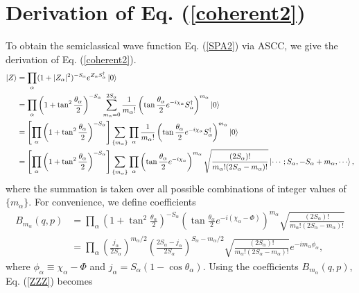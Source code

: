 \documentclass[11pt]{book} %
\begin{document}
\section{Derivation of Eq. (\ref{coherent2})}
\label{wave_func2}

To obtain the semiclassical wave function Eq. (\ref{SPA2}) via ASCC, we give the derivation of Eq. (\ref{coherent2}).
\begin{align}
\ket{Z} &= \prod_{\alpha} (1+|Z_{\alpha}|^2)^{-S_{\alpha}}e^{Z_{\alpha}S_{\alpha}^{\dag}}\ket{0} \nonumber \\
&= \prod_{\alpha} \left(1+\tan^2{\frac{\theta_{\alpha}}{2}}\right)^{-S_{\alpha}} \sum_{m_{\alpha}=0}^{2S_{\alpha}} \frac{1}{m_{\alpha}!}
  \left(
  \tan{\frac{\theta_{\alpha}}{2}}e^{-i\chi_{\alpha}}S_{\alpha}^{\dag} \right)^{m_{\alpha}} \ket{0} \nonumber \\
&= \left[ \prod_{\alpha} \left(1+\tan^2{\frac{\theta_{\alpha}}{2}}\right)^{-S_{\alpha}} \right] 
\sum_{\{m_{\alpha}\}} \prod_{\alpha} \frac{1}{m_{\alpha}!} 
  \left(
  \tan{\frac{\theta_{\alpha}}{2}}e^{-i\chi_{\alpha}}S_{\alpha}^{\dag} \right)^{m_{\alpha}} \ket{0} \nonumber \\
&= \left[ \prod_{\alpha} \left(1+\tan^2{\frac{\theta_{\alpha}}{2}}\right)^{-S_{\alpha}} \right] 
\sum_{\{m_{\alpha}\}} \prod_{\alpha} \left(
  \tan{\frac{\theta_{\alpha}}{2}}e^{-i\chi_{\alpha}} \right)^{m_{\alpha}} \sqrt{\frac{(2S_{\alpha})!}{m_{\alpha}!(2S_{\alpha}-m_{\alpha})!}}
  \ket{\cdots;S_{\alpha},-S_{\alpha}+m_{\alpha},\cdots}, 
\label{ZZZ}
\end{align}
where the summation is taken over all possible combinations
of integer values of $\{ m_\alpha\}$. For convenience, we define coefficients
\begin{align}
B_{m_{\alpha}}(q,p) &= \prod_{\alpha} \left(1+\tan^2{\frac{\theta_{\alpha}}{2}}\right)^{-S_{\alpha}} \left(
  \tan{\frac{\theta_{\alpha}}{2}}e^{-i(\chi_{\alpha}-\Phi)} \right)^{m_{\alpha}} \sqrt{\frac{(2S_{\alpha})!}{m_{\alpha}!(2S_{\alpha}-m_{\alpha})!}} \nonumber \\
 &=\prod_\alpha \left(\frac{j_\alpha}{2S_\alpha}\right)^{m_\alpha/2}\left(\frac{2S_\alpha-j_\alpha}{2S_\alpha}\right)^{S_\alpha-m_\alpha/2}
 \sqrt{\frac{(2S_\alpha)!}{m_\alpha!(2S_\alpha-m_\alpha)!}}
e^{-i m_\alpha\phi_\alpha} ,
\end{align}
where $\phi_\alpha \equiv\chi_{\alpha}-\Phi$ and $j_\alpha=S_\alpha(1-\cos{\theta_\alpha})$. Using the coefficients $B_{m_{\alpha}}(q,p)$, Eq. (\ref{ZZZ}) becomes
\end{document}
